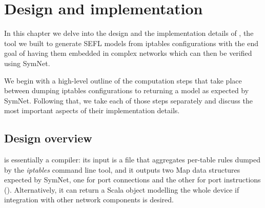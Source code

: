\chapter{Design and implementation}
In this chapter we delve into the design and the implementation details of
\TOOL, the tool we built to generate SEFL models from iptables configurations
with the end goal of having them embedded in complex networks which can then be
verified using SymNet.

We begin with a high-level outline of the computation steps that take place
between dumping iptables configurations to returning a model as expected by
SymNet.  Following that, we take each of those steps separately and discuss the
most important aspects of their implementation details.


\section{Design overview}

\TOOL is essentially a compiler: its input is a file that aggregates per-table
rules dumped by the \emph{iptables} command line tool, and it outputs two Map
data structures expected by SymNet, one for port connections and the other for
port instructions ().  Alternatively,
it can return a Scala object modelling the whole device if integration with
other network components is desired.

